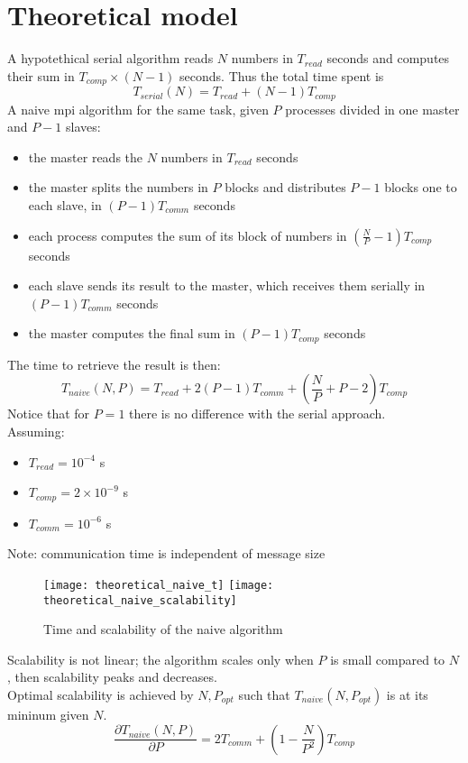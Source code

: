 \documentclass[a4paper, 11pt, twoside, openright]{article}
\begin{document}
\section{Theoretical model}
A hypotethical serial algorithm reads $N$ numbers in $T_{read}$ seconds and computes their sum in $T_{comp} \times (N-1)$ seconds. Thus the total time spent is
$$T_{serial}(N) = T_{read} + (N-1)T_{comp}$$
A naive mpi algorithm for the same task, given $P$ processes divided in one master and $P-1$ slaves:
\begin{itemize}
\item the master reads the $N$ numbers in $T_{read}$ seconds
\item the master splits the numbers in $P$ blocks and distributes $P-1$ blocks one to each slave, in $(P-1)T_{comm}$ seconds
\item each process computes the sum of its block of numbers in $\left(\frac{N}{P}-1\right)T_{comp}$ seconds
\item each slave sends its result to the master, which receives them serially in $(P-1)T_{comm}$ seconds
\item the master computes the final sum in $(P-1)T_{comp}$ seconds
\end{itemize}
The time to retrieve the result is then:
$$T_{naive}(N, P) = T_{read} + 2(P-1)T_{comm} + \left(\frac{N}{P}+P-2\right)T_{comp}$$
Notice that for $P=1$ there is no difference with the serial approach.\\
Assuming:
\begin{itemize}
\item $T_{read} = 10^{-4}$ s
\item $T_{comp} = 2 \times 10^{-9}$ s
\item $T_{comm} = 10^{-6}$ s
\end{itemize}
Note: communication time is independent of message size
\begin{figure}[h]
    \texttt{[image: theoretical\_naive\_t]}
    \texttt{[image: theoretical\_naive\_scalability]}
    \caption{Time and scalability of the naive algorithm}
\end{figure}
\FloatBarrier
Scalability is not linear; the algorithm scales only when $P$ is small compared to $N$, then scalability peaks and decreases.\\
Optimal scalability is achieved by $N, P_{opt}$ such that $T_{naive}(N, P_{opt})$ is at its mininum given $N$.\\
$$\frac{\partial T_{naive}(N, P)}{\partial P} = 2T_{comm} + \left(1-\frac{N}{P^{2}}\right)T_{comp}$$
\end{document}
